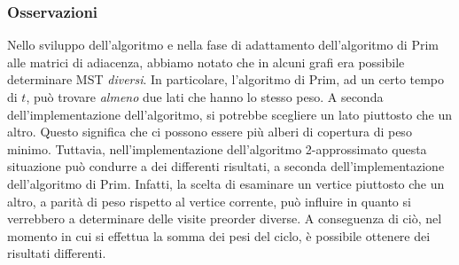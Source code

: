 \subsubsection{Osservazioni}

Nello sviluppo dell'algoritmo e nella fase di adattamento dell'algoritmo di Prim alle matrici 
di adiacenza, abbiamo notato che in alcuni grafi era possibile determinare 
MST \textit{diversi}. In particolare, l'algoritmo di Prim, ad un certo tempo di $t$, può trovare 
\textit{almeno} due lati che hanno lo stesso peso. A seconda dell'implementazione 
dell'algoritmo, si potrebbe scegliere un lato piuttosto che un altro. Questo significa che 
ci possono essere più alberi di copertura di peso minimo. Tuttavia, nell'implementazione 
dell'algoritmo 2-approssimato questa situazione può condurre a dei differenti risultati, 
a seconda dell'implementazione dell'algoritmo di Prim. Infatti, la scelta di esaminare un 
vertice piuttosto che un altro, a parità di peso rispetto al vertice corrente, può 
influire in quanto si verrebbero a determinare delle visite preorder diverse. A conseguenza 
di ciò, nel momento in cui si effettua la somma dei pesi del ciclo, è possibile ottenere 
dei risultati differenti.
